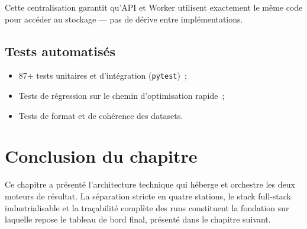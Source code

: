 Cette centralisation garantit qu'API et Worker utilisent exactement le même code
pour accéder au stockage — pas de dérive entre implémentations.

\subsection{Tests automatisés}

\begin{itemize}
    \item 87+ tests unitaires et d'intégration (\texttt{pytest})~;
    \item Tests de régression sur le chemin d'optimisation rapide~;
    \item Tests de format et de cohérence des datasets.
\end{itemize}

\section*{Conclusion du chapitre}

Ce chapitre a présenté l'architecture technique qui héberge et orchestre les deux
moteurs de résultat. La séparation stricte en quatre stations, le stack full-stack
industrialisable et la traçabilité complète des runs constituent la fondation sur
laquelle repose le tableau de bord final, présenté dans le chapitre suivant.
